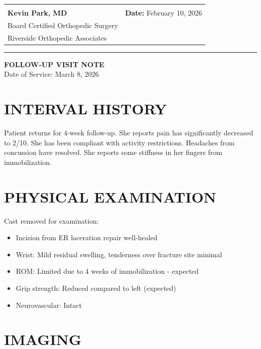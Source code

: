 \documentclass[11pt]{article}
\begin{document}
\vspace{2em}

\begin{tabular}{@{}p{7cm}p{7cm}@{}}
\hrulefill & \\
\textbf{Kevin Park, MD} & \textbf{Date:} February 10, 2026 \\
Board Certified Orthopedic Surgery & \\
Riverside Orthopedic Associates & \\
\end{tabular}

\vspace{3em}
\hrule
\vspace{1em}

\begin{center}
{\Large\bfseries FOLLOW-UP VISIT NOTE}\\
{\normalsize Date of Service: March 8, 2026}
\end{center}

\vspace{1em}

\section*{INTERVAL HISTORY}

Patient returns for 4-week follow-up. She reports pain has significantly decreased to 2/10. She has been compliant with activity restrictions. Headaches from concussion have resolved. She reports some stiffness in her fingers from immobilization.

\section*{PHYSICAL EXAMINATION}

Cast removed for examination:
\begin{itemize}[nosep]
\item Incision from ER laceration repair well-healed
\item Wrist: Mild residual swelling, tenderness over fracture site minimal
\item ROM: Limited due to 4 weeks of immobilization - expected
\item Grip strength: Reduced compared to left (expected)
\item Neurovascular: Intact
\end{itemize}

\section*{IMAGING}
\end{document}
